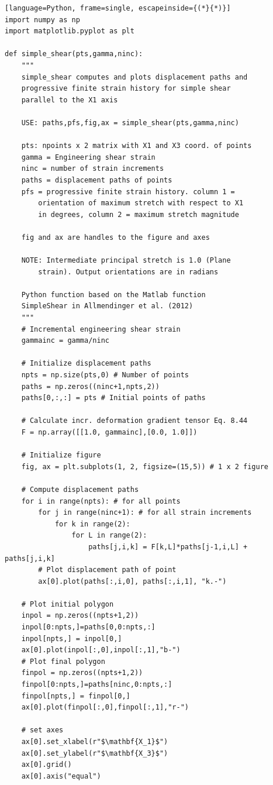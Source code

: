 \documentclass[a4paper , 12pt]{book}
\begin{document}
\begin{center}
\begin{lstlisting}[language=Python, frame=single, escapeinside={(*}{*)}]
import numpy as np
import matplotlib.pyplot as plt

def simple_shear(pts,gamma,ninc):
	"""
	simple_shear computes and plots displacement paths and
	progressive finite strain history for simple shear
	parallel to the X1 axis
	
	USE: paths,pfs,fig,ax = simple_shear(pts,gamma,ninc)
	
	pts: npoints x 2 matrix with X1 and X3 coord. of points
	gamma = Engineering shear strain
	ninc = number of strain increments
	paths = displacement paths of points
	pfs = progressive finite strain history. column 1 =
		orientation of maximum stretch with respect to X1 
		in degrees, column 2 = maximum stretch magnitude
		
	fig and ax are handles to the figure and axes
	
	NOTE: Intermediate principal stretch is 1.0 (Plane 
		strain). Output orientations are in radians
		
	Python function based on the Matlab function
	SimpleShear in Allmendinger et al. (2012)
	"""
	# Incremental engineering shear strain
	gammainc = gamma/ninc
	
	# Initialize displacement paths
	npts = np.size(pts,0) # Number of points
	paths = np.zeros((ninc+1,npts,2))
	paths[0,:,:] = pts # Initial points of paths
	
	# Calculate incr. deformation gradient tensor Eq. 8.44
	F = np.array([[1.0, gammainc],[0.0, 1.0]])
	
	# Initialize figure
	fig, ax = plt.subplots(1, 2, figsize=(15,5)) # 1 x 2 figure
	
	# Compute displacement paths
	for i in range(npts): # for all points
		for j in range(ninc+1): # for all strain increments
			for k in range(2):
				for L in range(2):
					paths[j,i,k] = F[k,L]*paths[j-1,i,L] + paths[j,i,k]
		# Plot displacement path of point
		ax[0].plot(paths[:,i,0], paths[:,i,1], "k.-")
	
	# Plot initial polygon
	inpol = np.zeros((npts+1,2))
	inpol[0:npts,]=paths[0,0:npts,:]
	inpol[npts,] = inpol[0,]
	ax[0].plot(inpol[:,0],inpol[:,1],"b-")
	# Plot final polygon
	finpol = np.zeros((npts+1,2))
	finpol[0:npts,]=paths[ninc,0:npts,:]
	finpol[npts,] = finpol[0,]
	ax[0].plot(finpol[:,0],finpol[:,1],"r-")
	
	# set axes
	ax[0].set_xlabel(r"$\mathbf{X_1}$")
	ax[0].set_ylabel(r"$\mathbf{X_3}$")
	ax[0].grid()
	ax[0].axis("equal")
	

\end{lstlisting}
\end{center}
\end{document}

